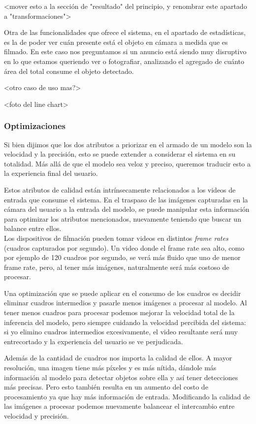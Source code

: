 \documentclass[a4paper]{article}
\begin{document}
<mover esto a la sección de "resultado" del principio, y renombrar este apartado a "transformaciones">

Otra de las funcionalidades que ofrece el sistema, en el apartado de estadísticas, es la de poder ver cuán presente está el objeto en cámara a medida que es filmado. En este caso nos preguntamos si un anuncio está siendo muy disruptivo en lo que estamos queriendo ver o fotografiar, analizando el agregado de cuánto área del total consume el objeto detectado.

<otro caso de uso mas?>

<foto del line chart>

\subsubsection{Optimizaciones}

Si bien dijimos que los dos atributos a priorizar en el armado de un modelo son la velocidad y la precisión, esto se puede extender a considerar el sistema en su totalidad. Más allá de que el modelo sea veloz y preciso, queremos traducir esto a la experiencia final del usuario.

Estos atributos de calidad están intrínsecamente relacionados a los videos de entrada que consume el sistema. En el traspaso de las imágenes capturadas en la cámara del usuario a la entrada del modelo, se puede manipular esta información para optimizar los atributos mencionados, nuevamente teniendo que buscar un balance entre ellos. \\

Los dispositivos de filmación pueden tomar videos en distintos \textit{frame rates} (cuadros capturados por segundo). Un video donde el frame rate sea alto, como por ejemplo de 120 cuadros por segundo, se verá más fluido que uno de menor frame rate, pero, al tener más imágenes, naturalmente será más costoso de procesar.

Una optimización que se puede aplicar en el consumo de los cuadros es decidir eliminar cuadros intermedios y pasarle menos imágenes a procesar al modelo. Al tener menos cuadros para procesar podemos mejorar la velocidad total de la inferencia del modelo, pero siempre cuidando la velocidad percibida del sistema: si yo elimino cuadros intermedios excesivamente, el video resultante será muy entrecortado y la experiencia del usuario se ve perjudicada.

Además de la cantidad de cuadros nos importa la calidad de ellos. A mayor resolución, una imagen tiene más píxeles y es más nítida, dándole más información al modelo para detectar objetos sobre ella y así tener detecciones más precisas. Pero esto también resulta en un aumento del costo de procesamiento ya que hay más información de entrada. Modificando la calidad de las imágenes a procesar podemos nuevamente balancear el intercambio entre velocidad y precisión.
\end{document}
